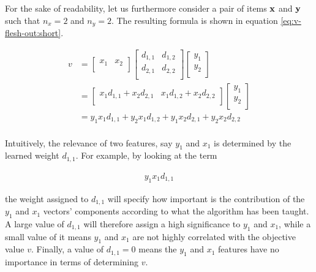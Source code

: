 For the sake of readability, let us furthermore consider a pair of items $\boldsymbol{\mathbf{x}}$ and $\boldsymbol{\mathbf{y}}$ such that $n_x = 2$ and $n_y = 2$. The resulting formula is shown in equation \ref{eq:v-flesh-out:short}.

\begin{equation} \label{eq:v-flesh-out:short}
    \begin{split} 
        v &= 
            \begin{bmatrix}
                x_{1} & x_{2} \\
            \end{bmatrix}
            \begin{bmatrix}
                d_{1,1} & d_{1,2} \\
                d_{2,1} & d_{2,2} \\
            \end{bmatrix}
            \begin{bmatrix}
                y_{1} \\
                y_{2} \\
            \end{bmatrix} \\
        &=
            \begin{bmatrix}
                x_{1}d_{1,1} + x_{2}d_{2,1} & x_{1}d_{1,2} + x_{2}d_{2,2} \\
            \end{bmatrix}    
            \begin{bmatrix}
                y_{1} \\
                y_{2} \\
            \end{bmatrix} \\
        &= 
            y_{1}x_{1}d_{1,1} + y_{2}x_{1}d_{1,2} + y_{1}x_{2}d_{2,1} + y_{2}x_{2}d_{2,2} \\
    \end{split}
\end{equation}

Intuitively, the relevance of two features, say $y_1$ and $x_1$ is determined by the learned weight $d_{1,1}$. For example, by looking at the term

\begin{equation} \nonumber
    \begin{split}
        y_{1}x_{1}d_{1,1}
    \end{split}
\end{equation}

the weight assigned to $d_{1,1}$ will specify how important is the contribution of the $y_1$ and $x_1$ vectors' components according to what the \mlblink algorithm has been taught. A large value of $d_{1,1}$ will therefore assign a high significance to $y_1$ and $x_1$, while a small value of it means $y_1$ and $x_1$ are not highly correlated with the objective value $v$. Finally, a value of $d_{1,1} = 0$ means the $y_1$ and $x_1$ features have no importance in terms of determining $v$.  \newline

